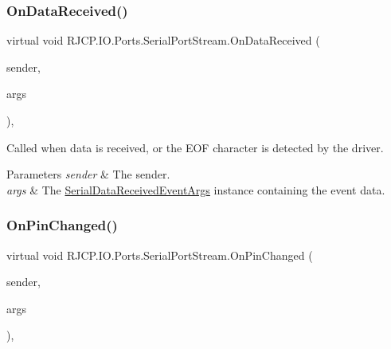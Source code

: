 \subsubsection{\texorpdfstring{OnDataReceived()}{OnDataReceived()}}
{\footnotesize\ttfamily virtual void R\+J\+C\+P.\+I\+O.\+Ports.\+Serial\+Port\+Stream.\+On\+Data\+Received (\begin{DoxyParamCaption}\item[{object}]{sender,  }\item[{\mbox{\hyperlink{class_r_j_c_p_1_1_i_o_1_1_ports_1_1_serial_data_received_event_args}{Serial\+Data\+Received\+Event\+Args}}}]{args }\end{DoxyParamCaption})\hspace{0.3cm}{\ttfamily [protected]}, {\ttfamily [virtual]}}



Called when data is received, or the E\+OF character is detected by the driver. 


\begin{DoxyParams}{Parameters}
{\em sender} & The sender.\\
\hline
{\em args} & The \mbox{\hyperlink{class_r_j_c_p_1_1_i_o_1_1_ports_1_1_serial_data_received_event_args}{Serial\+Data\+Received\+Event\+Args}} instance containing the event data.\\
\hline
\end{DoxyParams}
\mbox{\label{class_r_j_c_p_1_1_i_o_1_1_ports_1_1_serial_port_stream_af0988ba0b2d418cda6fe84ef833615fb}} 
\subsubsection{\texorpdfstring{OnPinChanged()}{OnPinChanged()}}
{\footnotesize\ttfamily virtual void R\+J\+C\+P.\+I\+O.\+Ports.\+Serial\+Port\+Stream.\+On\+Pin\+Changed (\begin{DoxyParamCaption}\item[{object}]{sender,  }\item[{\mbox{\hyperlink{class_r_j_c_p_1_1_i_o_1_1_ports_1_1_serial_pin_changed_event_args}{Serial\+Pin\+Changed\+Event\+Args}}}]{args }\end{DoxyParamCaption})\hspace{0.3cm}{\ttfamily [protected]}, {\ttfamily [virtual]}}



